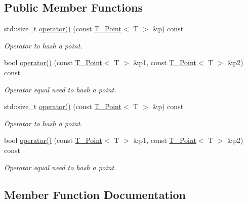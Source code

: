 \subsection*{Public Member Functions}
\begin{DoxyCompactItemize}
\item 
std\+::size\+\_\+t \hyperlink{structT__Point_1_1hash__point_a6d41490eb7af074b029db524a80e2e53}{operator()} (const \hyperlink{classT__Point}{T\+\_\+\+Point}$<$ T $>$ \&p) const
\begin{DoxyCompactList}\small\item\em Operator to hash a point. \end{DoxyCompactList}\item 
bool \hyperlink{structT__Point_1_1hash__point_a92f4c83c6538fcb66804d44e944d7b20}{operator()} (const \hyperlink{classT__Point}{T\+\_\+\+Point}$<$ T $>$ \&p1, const \hyperlink{classT__Point}{T\+\_\+\+Point}$<$ T $>$ \&p2) const
\begin{DoxyCompactList}\small\item\em Operator equal need to hash a point. \end{DoxyCompactList}\item 
std\+::size\+\_\+t \hyperlink{structT__Point_1_1hash__point_a6d41490eb7af074b029db524a80e2e53}{operator()} (const \hyperlink{classT__Point}{T\+\_\+\+Point}$<$ T $>$ \&p) const
\begin{DoxyCompactList}\small\item\em Operator to hash a point. \end{DoxyCompactList}\item 
bool \hyperlink{structT__Point_1_1hash__point_a92f4c83c6538fcb66804d44e944d7b20}{operator()} (const \hyperlink{classT__Point}{T\+\_\+\+Point}$<$ T $>$ \&p1, const \hyperlink{classT__Point}{T\+\_\+\+Point}$<$ T $>$ \&p2) const
\begin{DoxyCompactList}\small\item\em Operator equal need to hash a point. \end{DoxyCompactList}\end{DoxyCompactItemize}


\subsection{Member Function Documentation}
\mbox{\label{structT__Point_1_1hash__point_a6d41490eb7af074b029db524a80e2e53}} 
